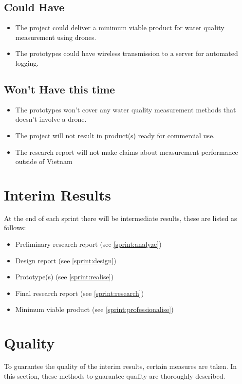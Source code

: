 \documentclass[11pt, a4paper]{article}
\begin{document}
\subsection{Could Have}
\begin{itemize}
  \item The project could deliver a minimum viable product for water quality measurement using drones.
  \item The prototypes could have wireless transmission to a server for automated logging.
\end{itemize}
\subsection{Won’t Have this time}
\begin{itemize}
  \item The prototypes won't cover any water quality measurement methods that doesn't involve a drone.
  \item The project will not result in product(s) ready for commercial use.
  \item The research report will not make claims about measurement performance outside of Vietnam
\end{itemize}

\section{Interim Results}\label{interimresults}
At the end of each sprint there will be intermediate results, these are listed as follows:
\begin{itemize}
  \item Preliminary research report (see \ref{sprint:analyze})
  \item Design report (see \ref{sprint:design})
  \item Prototype(s) (see \ref{sprint:realise})
  \item Final research report (see \ref{sprint:research})
  \item Minimum viable product (see \ref{sprint:professionalise})
\end{itemize}

\section{Quality}
To guarantee the quality of the interim results, certain measures are taken. In this section, these methods to guarantee quality are thoroughly described.
\end{document}
